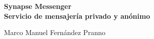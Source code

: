 \chapter*{}






\cleardoublepage
\thispagestyle{empty}

\begin{center}
{\large\bfseries Synapse Messenger \\ Servicio de mensajería privado y anónimo}\\
\end{center}
\begin{center}
Marco Manuel Fernández Pranno\\
\end{center}

